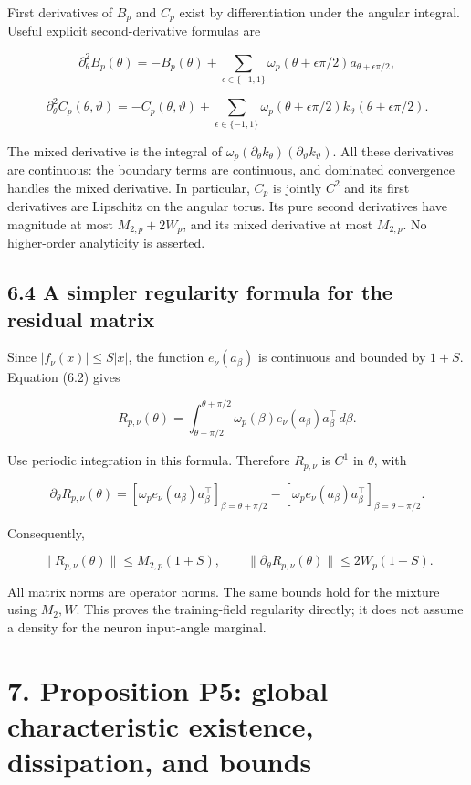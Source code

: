 \documentclass[
  10pt,
]{article}
\begin{document}
First derivatives of \(B_p\) and \(C_p\) exist by differentiation under
the angular integral. Useful explicit second-derivative formulas are

\[
 \partial_\theta^2B_p(\theta)=-B_p(\theta)
 +\sum_{\epsilon\in\{-1,1\}}
 \omega_p(\theta+\epsilon\pi/2)a_{\theta+\epsilon\pi/2},
\]

\[
 \partial_\theta^2C_p(\theta,\vartheta)=-C_p(\theta,\vartheta)
 +\sum_{\epsilon\in\{-1,1\}}
 \omega_p(\theta+\epsilon\pi/2)k_\vartheta(\theta+\epsilon\pi/2).
 \tag{6.10}
\]

The mixed derivative is the integral of
\(\omega_p(\partial_\theta k_\theta)(\partial_\vartheta k_\vartheta)\).
All these derivatives are continuous: the boundary terms are continuous,
and dominated convergence handles the mixed derivative. In particular,
\(C_p\) is jointly \(C^2\) and its first derivatives are Lipschitz on
the angular torus. Its pure second derivatives have magnitude at most
\(M_{2,p}+2W_p\), and its mixed derivative at most \(M_{2,p}\). No
higher-order analyticity is asserted.

\subsection{6.4 A simpler regularity formula for the residual
matrix}\label{a-simpler-regularity-formula-for-the-residual-matrix}

Since \(|f_\nu(x)|\le S|x|\), the function \(e_\nu(a_\beta)\) is
continuous and bounded by \(1+S\). Equation (6.2) gives

\[
 R_{p,\nu}(\theta)=
 \int_{\theta-\pi/2}^{\theta+\pi/2}
 \omega_p(\beta)e_\nu(a_\beta)a_\beta^\top\,d\beta.
 \tag{6.11}
\]

Use periodic integration in this formula. Therefore \(R_{p,\nu}\) is
\(C^1\) in \(\theta\), with

\[
 \partial_\theta R_{p,\nu}(\theta)=
 [\omega_p e_\nu(a_\beta)a_\beta^\top]_{\beta=\theta+\pi/2}
 -[\omega_p e_\nu(a_\beta)a_\beta^\top]_{\beta=\theta-\pi/2}.
 \tag{6.12}
\]

Consequently,

\[
 \|R_{p,\nu}(\theta)\|\le M_{2,p}(1+S),\qquad
 \|\partial_\theta R_{p,\nu}(\theta)\|\le2W_p(1+S).
 \tag{6.13}
\]

All matrix norms are operator norms. The same bounds hold for the
mixture using \(M_2,W\). This proves the training-field regularity
directly; it does not assume a density for the neuron input-angle
marginal.

\section{7. Proposition P5: global characteristic existence,
dissipation, and
bounds}\label{proposition-p5-global-characteristic-existence-dissipation-and-bounds}
\end{document}
